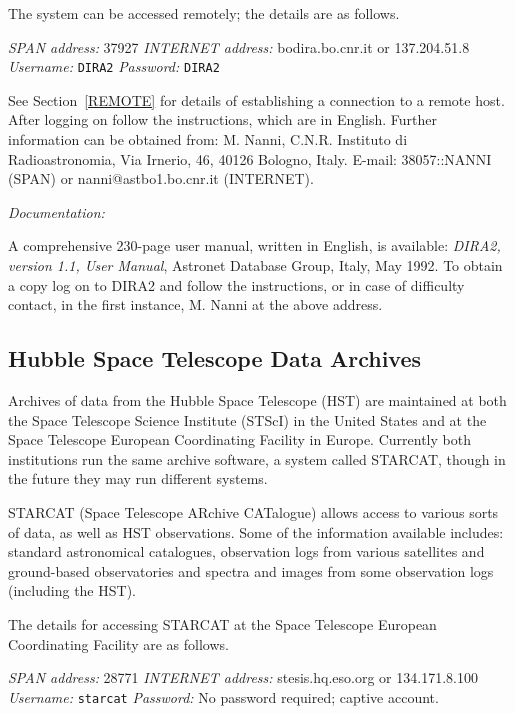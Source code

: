 \documentclass[twoside,11pt,nolof]{starlink}
\begin{document}
The system can be accessed remotely; the details are as follows.

\textit{SPAN address: } 37927
\newline \textit{INTERNET address:} bodira.bo.cnr.it or 137.204.51.8
\newline \textit{Username:} \verb-DIRA2-
\newline \textit{Password:} \verb-DIRA2-

See Section~\ref{REMOTE} for details of establishing a connection to
a remote host. After logging on follow the instructions, which are in
English. Further information can be obtained from: M. Nanni, C.N.R.
Instituto di Radioastronomia, Via Irnerio, 46, 40126 Bologno, Italy.
E-mail: 38057::NANNI (SPAN) or nanni@astbo1.bo.cnr.it (INTERNET).

\textit{Documentation:}

A comprehensive 230-page user manual, written in English, is available:
\textit{DIRA2, version 1.1, User Manual}, Astronet Database Group, Italy,
May 1992. To obtain a copy log on to DIRA2 and follow the instructions,
or in case of difficulty contact, in the first instance, M. Nanni at
the above address.

\subsection{Hubble Space Telescope Data Archives
}

Archives of data from the Hubble Space Telescope (HST) are maintained at
both the Space Telescope Science Institute (STScI) in the United States
and at the Space Telescope European Coordinating Facility in Europe.
Currently both institutions run the same archive software, a system
called STARCAT, though in the future they may run different systems.

STARCAT (Space Telescope ARchive CATalogue) allows access to various
sorts of data, as well as HST observations. Some of the information
available includes: standard astronomical catalogues, observation logs
from various satellites and ground-based observatories and spectra
and images from some observation logs (including the HST).

The details for accessing STARCAT at the Space Telescope European
Coordinating Facility are as follows.

\textit{SPAN address: } 28771
\newline \textit{INTERNET address:} stesis.hq.eso.org or 134.171.8.100
\newline \textit{Username:} \verb-starcat-
\newline \textit{Password:} No password required; captive account.
\end{document}
